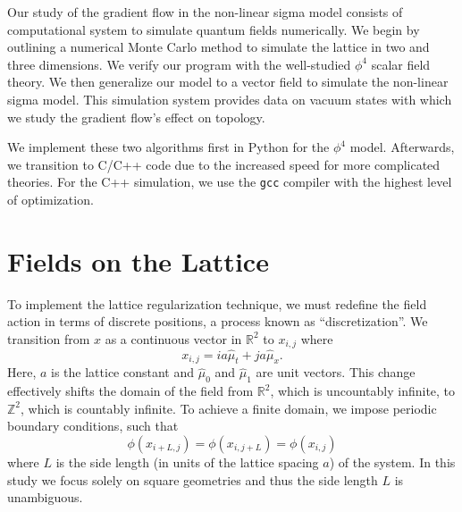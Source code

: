 Our study of the gradient flow in the non-linear sigma model consists of computational system to simulate quantum fields numerically. We begin by outlining a numerical Monte Carlo method to simulate the lattice in two and three dimensions. We verify our program with the well-studied $\phi^4$ scalar field theory. We then generalize our model to a vector field to simulate the non-linear sigma model. This simulation system provides data on vacuum states with which we study the gradient flow's effect on topology.

We implement these two algorithms first in Python for the $\phi^4$ model. Afterwards, we transition to C/C++ code due to the increased speed for more complicated theories. For the C++ simulation, we use the \texttt{gcc} compiler with the highest level of optimization.



\section{Fields on the Lattice}
To implement the lattice regularization technique, we must redefine the field action in terms of discrete positions, a process known as ``discretization''. We transition from $x$ as a continuous vector in $\mathbb{R}^2$ to $x_{i,j}$ where
\begin{equation}
    x_{i,j} = ia \hat{\mu}_t + j a \hat{\mu}_x.
\end{equation}
Here, $a$ is the lattice constant and $\hat{\mu}_0$ and $\hat{\mu}_1$ are unit vectors. This change effectively shifts the domain of the field from $\mathbb{R}^2$, which is uncountably infinite, to $\mathbb{Z}^2$, which is countably infinite. To achieve a finite domain, we impose periodic boundary conditions, such that 
\begin{equation}
    \phi\left(x_{i+L,j}\right) = \phi\left(x_{i,j+L}\right) = \phi\left(x_{i,j}\right)
\end{equation}
where $L$ is the side length (in units of the lattice spacing $a$) of the system. In this study we focus solely on square geometries and thus the side length $L$ is unambiguous.


